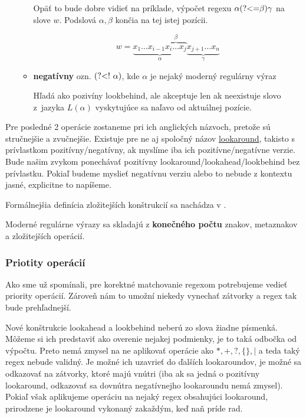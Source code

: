 \begin{itemize}
\begin{itemize}
Opäť to bude dobre vidieť na príklade, výpočet regexu $\alpha\text{(?\textless =}\beta)\gamma$ na slove $w$. Podslová $\alpha,\beta$ končia na tej istej pozícii.

$$w = \underbrace{x_1\dots x_{i-1} \overbrace{x_i \dots x_j}^\beta}_\alpha \underbrace{x_{j+1} \dots x_n }_\gamma$$
\item \textbf{negatívny} ozn. $\text{(?\textless !~}\alpha)$, kde $\alpha$ je nejaký moderný regulárny výraz 

Hľadá ako pozivíny lookbehind, ale akceptuje len ak neexistuje slovo z~jazyka $L(\alpha)$ vyskytujúce sa naľavo od aktuálnej pozície.
\end{itemize}
\end{itemize}

Pre posledné 2 operácie zostaneme pri ich anglických názvoch, pretože sú stručnejšie a zvučnejšie. Existuje pre ne aj spoločný názov \underline{lookaround}, takisto s prívlastkom pozitívny/negatívny, ak myslíme iba ich pozitívne/negatívne verzie. Bude našim zvykom ponechávať pozitívny lookaround/lookahead/lookbehind bez prívlastku. Pokiaľ budeme myslieť negatívnu verziu alebo to nebude z kontextu jasné, explicitne to napíšeme.

Formálnejšia definícia zložitejších konštrukcií sa nachádza v \cite{mojaBak}.
\\ \par
Moderné regulárne výrazy sa skladajú z \textbf{konečného počtu} znakov, metaznakov a zložitejších operácií.

\subsubsection{Priotity operácií}

Ako sme už spomínali, pre korektné matchovanie regexom potrebujeme vedieť priority operácií. Zároveň nám to umožní niekedy vynechať zátvorky a regex tak bude prehľadnejší.

Nové konštrukcie lookahead a lookbehind neberú zo slova žiadne písmenká. Môžeme si ich predstaviť ako overenie nejakej podmienky, je to taká odbočka od výpočtu. Preto nemá zmysel na ne aplikovať operácie ako $*,+,?,\lbrace\rbrace,|$ a teda taký regex nebude validný. Je možné ich uzavrieť do ďalších lookaroundov, je možné sa odkazovať na zátvorky, ktoré majú vnútri (iba ak sa jedná o pozitívny lookaround, odkazovať sa dovnútra negatívnejho lookaroundu nemá zmysel). Pokiaľ však aplikujeme operáciu na nejaký regex obsahujúci lookaround, prirodzene je lookaround vykonaný zakaždým, keď naň príde rad.

